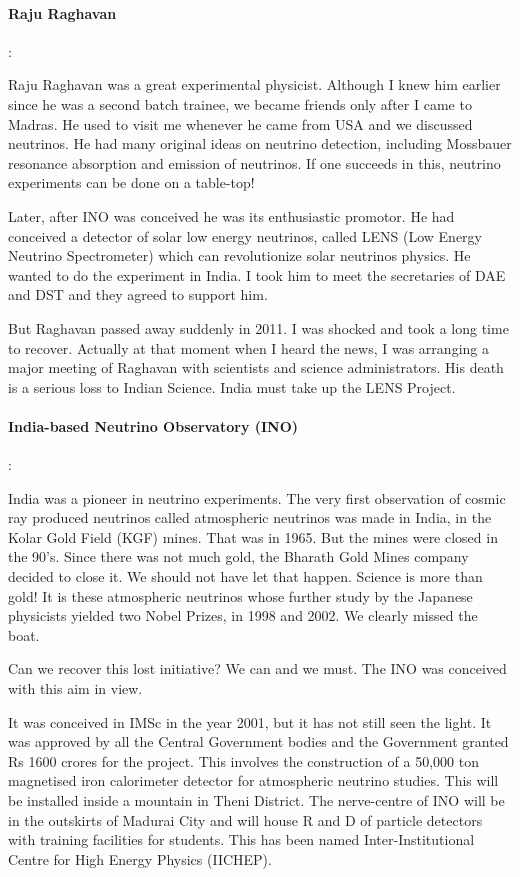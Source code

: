 \paragraph{Raju Raghavan}:

Raju Raghavan was a great experimental physicist. Although I knew him 
earlier since he was a second batch trainee, we became friends only 
after I came to Madras. He used to visit me whenever he came from USA 
and we discussed neutrinos. He had many original ideas on neutrino 
detection, including Mossbauer resonance absorption and emission of 
neutrinos. If one succeeds in this, neutrino experiments can be done on 
a table-top!

Later, after INO was conceived he was its enthusiastic promotor. He had 
conceived a detector of solar low energy neutrinos, called LENS (Low 
Energy Neutrino Spectrometer) which can revolutionize solar neutrinos 
physics. He wanted to do the experiment in India. I took him to meet the 
secretaries of DAE and DST and they agreed to support him.

But Raghavan passed away suddenly in 2011. I was shocked and took a long 
time to recover. Actually at that moment when I heard the news, I was 
arranging a major meeting of Raghavan with scientists and science 
administrators. His death is a serious loss to Indian Science. India 
must take up the LENS Project.

\paragraph{India-based Neutrino Observatory (INO)}:

India was a pioneer in neutrino experiments. The very first observation 
of cosmic ray produced neutrinos called atmospheric neutrinos was made 
in India, in the Kolar Gold Field (KGF) mines. That was in 1965. But the 
mines were closed in the 90's. Since there was not much gold, the 
Bharath Gold Mines company decided to close it. We should not have let 
that happen. Science is more than gold! It is these atmospheric 
neutrinos whose further study by the Japanese physicists yielded two 
Nobel Prizes, in 1998 and 2002. We clearly missed the boat.

Can we recover this lost initiative? We can and we must. The INO was 
conceived with this aim in view.

It was conceived in IMSc in the year 2001, but it has not still seen the 
light. It was approved by all the Central Government bodies and the 
Government granted Rs 1600 crores for the project. This involves the 
construction of a 50,000 ton magnetised iron calorimeter detector for 
atmospheric neutrino studies. This will be installed inside a mountain 
in Theni District. The nerve-centre of INO will be in the outskirts of 
Madurai City and will house R and D of particle detectors with training 
facilities for students. This has been named Inter-Institutional Centre 
for High Energy Physics (IICHEP).

